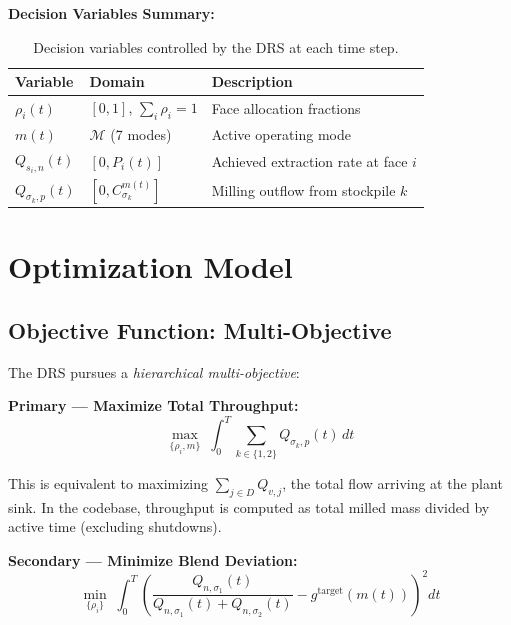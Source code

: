 \documentclass[11pt,a4paper]{article}
\theoremstyle{definition}
\begin{document}
\medskip

\noindent\textbf{Decision Variables Summary:}

\begin{table}[H]
\centering
\caption{Decision variables controlled by the DRS at each time step.}
\label{tab:decision-vars}
\begin{tabular}{@{}lll@{}}
\toprule
\textbf{Variable} & \textbf{Domain} & \textbf{Description} \\
\midrule
$\rho_i(t)$ & $[0,1]$, $\sum_i \rho_i = 1$ & Face allocation fractions \\
$m(t)$ & $\mathcal{M}$ (7 modes) & Active operating mode \\
$Q_{s_i,n}(t)$ & $[0, P_i(t)]$ & Achieved extraction rate at face $i$ \\
$Q_{\sigma_k,p}(t)$ & $[0, C^{m(t)}_{\sigma_k}]$ & Milling outflow from stockpile $k$ \\
\bottomrule
\end{tabular}
\end{table}


\section{Optimization Model}
\label{sec:optimization}

\subsection{Objective Function: Multi-Objective}

The DRS pursues a \emph{hierarchical multi-objective}:

\medskip
\noindent\textbf{Primary — Maximize Total Throughput:}
\begin{equation}
  \boxed{
    \max_{\{\rho_i, m\}} \;
    \int_0^T \sum_{k \in \{1,2\}} Q_{\sigma_k, p}(t) \, dt
  }
  \label{eq:obj-throughput}
\end{equation}

This is equivalent to maximizing $\sum_{j \in D} Q_{v,j}$, the total flow arriving
at the plant sink.  In the codebase, throughput is computed as total milled mass
divided by active time (excluding shutdowns).

\medskip
\noindent\textbf{Secondary — Minimize Blend Deviation:}
\begin{equation}
  \min_{\{\rho_i\}} \;
  \int_0^T \left(
    \frac{Q_{n,\sigma_1}(t)}{Q_{n,\sigma_1}(t) + Q_{n,\sigma_2}(t)}
    - g^{\text{target}}(m(t))
  \right)^2 dt
  \label{eq:obj-blend}
\end{equation}
\end{document}
